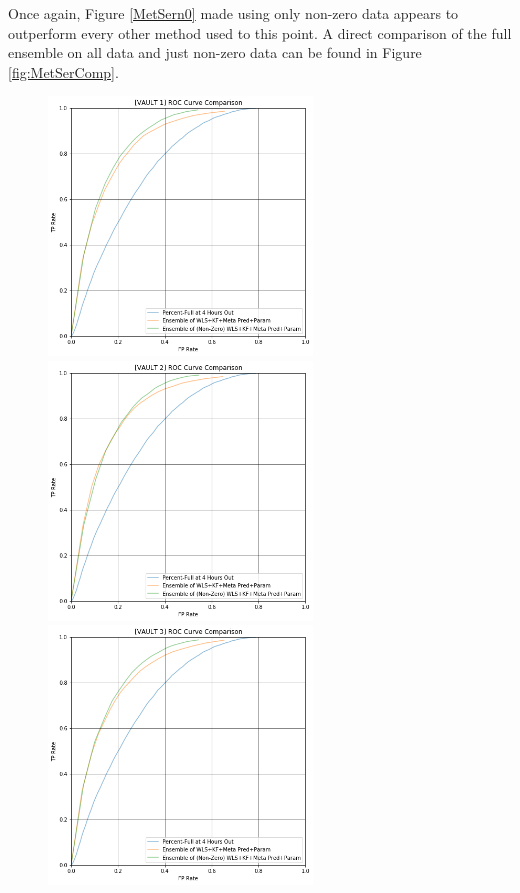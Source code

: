 Once again, Figure \ref{MetSern0} made using only non-zero data appears to outperform every other method used to this point. A direct comparison of the full ensemble on all data and just non-zero data can be found in Figure \ref{fig:MetSerComp}.

\pagebreak

\begin{figure}[h]
\centering
\includegraphics[width=7cm]{body/results/Graphs/Meta+Series/Compare/v1.png}
\includegraphics[width=7cm]{body/results/Graphs/Meta+Series/Compare/v2.png}
\includegraphics[width=7cm]{body/results/Graphs/Meta+Series/Compare/v3.png}

\end{figure}
